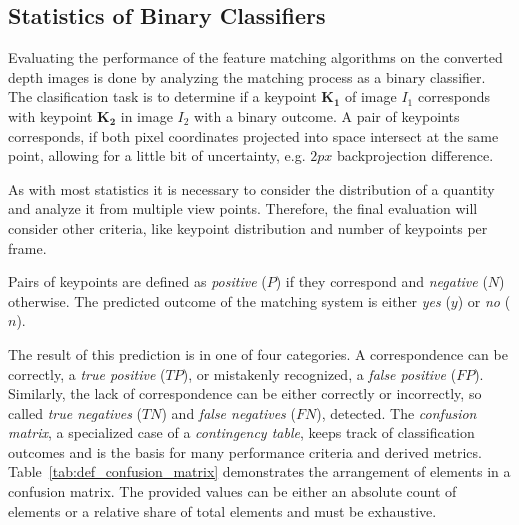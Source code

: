 \subsection{Statistics of Binary Classifiers}

Evaluating the performance of the feature matching algorithms on the converted depth images is done by analyzing the matching process as a binary classifier.
The clasification task is to determine if a keypoint $\mathbf{K_1}$ of image $I_1$ corresponds with keypoint $\mathbf{K_2}$ in image $I_2$ with a binary outcome.
A pair of keypoints corresponds, if both pixel coordinates projected into space intersect at the same point, allowing for a little bit of uncertainty, e.g. $2px$ backprojection difference.

As with most statistics it is necessary to consider the distribution of a quantity and analyze it from multiple view points.
Therefore, the final evaluation will consider other criteria, like keypoint distribution and number of keypoints per frame.

Pairs of keypoints are defined as \emph{positive} ($P$) if they correspond and \emph{negative} ($N$) otherwise.
The predicted outcome of the matching system is either \emph{yes} ($y$) or \emph{no} ($n$).

The result of this prediction is in one of four categories.
A correspondence can be correctly, a \emph{true positive} ($TP$), or mistakenly recognized, a \emph{false positive} ($FP$).
Similarly, the lack of correspondence can be either correctly or incorrectly, so called \emph{true negatives} ($TN$) and \emph{false negatives} ($FN$), detected.
The \emph{confusion matrix}, a specialized case of a \emph{contingency table}\cite{agresti_2007}, keeps track of classification outcomes and is the basis for many performance criteria and derived metrics.
Table~\ref{tab:def_confusion_matrix} demonstrates the arrangement of elements in a confusion matrix.
The provided values can be either an absolute count of elements or a relative share of total elements and must be exhaustive.

